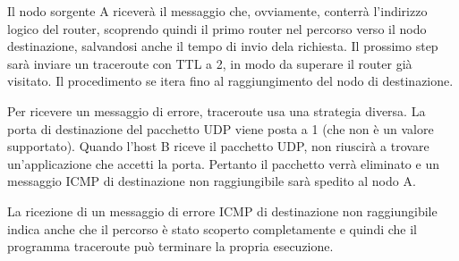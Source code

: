            Il nodo sorgente A riceverà il messaggio che, ovviamente, conterrà l'indirizzo logico del router, scoprendo quindi il primo router nel percorso verso il nodo destinazione, salvandosi anche il tempo di invio dela richiesta. Il prossimo step sarà inviare un traceroute con TTL a 2, in modo da superare il router già visitato. Il procedimento se itera fino al raggiungimento del nodo di destinazione.
        
            \vspace{3mm}
        
            Per ricevere un messaggio di errore, traceroute usa una strategia diversa. La porta di destinazione del pacchetto UDP viene posta a 1 (che non è un valore supportato). Quando l'host B riceve il pacchetto UDP, non riuscirà a trovare un'applicazione che accetti la porta. Pertanto il pacchetto verrà eliminato e un messaggio ICMP di destinazione non raggiungibile sarà spedito al nodo A.
            
            La ricezione di un messaggio di errore ICMP di destinazione non raggiungibile indica anche che il percorso è stato scoperto completamente e quindi che il programma traceroute può terminare la propria esecuzione.